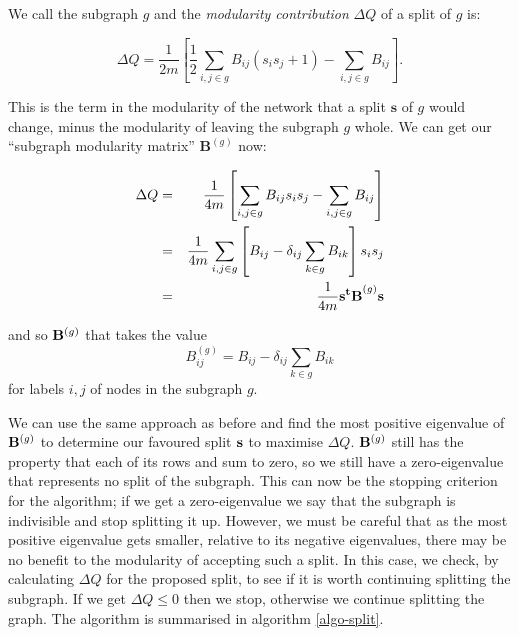 \documentclass[a4paper,12pt]{report}
\begin{document}
We call the subgraph $g$ and the {\sl modularity contribution} $\Delta Q$ of a 
split of $g$ is:

\begin{equation}
\Delta Q  =  \frac{1}{2m} \left[ \frac{1}{2}\sum_{i,j\in g}B_{ij}(s_is_j + 1) - \sum_{i,j \in g} B_{ij} \right].
\end{equation}

This is the term in the modularity of the network that a split $\mathbf{s}$ of 
$g$ would change, minus the modularity of leaving the subgraph $g$ whole.  We 
can get our ``subgraph modularity matrix'' $\mathbf{B}^{(g)}$ now:

\begin{samepage}
\begin{eqnarray}
\Delta Q & = & \frac{1}{4m}\left[ \sum_{i,j \in g} B_{ij}s_is_j - \sum_{i,j \in g}B_{ij}\right] \cr
& = & \frac{1}{4m}\sum_{i,j \in g}\left[ B_{ij} - \delta_{ij}\sum_{k \in g} B_{ik}\right]s_is_j \cr
& = & \frac{1}{4m}{\bf s^tB}^{(g)}{\bf s}
\end{eqnarray}
\end{samepage}
and so ${\bf B}^{(g)}$ that takes the value
\begin{equation}
B^{(g)}_{ij} = B_{ij} - \delta_{ij}\sum_{k \in g} B_{ik}
\end{equation}
for labels $i,j$ of nodes in the subgraph $g$.

We can use the same approach as before and find the most
positive eigenvalue of ${\bf B}^{(g)}$ to determine our favoured split
${\bf s}$ to maximise $\Delta Q$. ${\bf B}^{(g)}$ still has the
property that each of its rows and sum to zero, so we still have a
zero-eigenvalue that represents no split of the subgraph.  This can
now be the stopping criterion for the algorithm; if we get a
zero-eigenvalue we say that the subgraph is indivisible and stop
splitting it up.  However, we must be careful that as the most
positive eigenvalue gets smaller, relative to its negative
eigenvalues, there may be no benefit to the modularity of accepting
such a split.  In this case, we check, by calculating $\Delta Q$ for
the proposed split, to see if it is worth continuing splitting the subgraph.
If we get $\Delta Q \leq 0$ then we stop, otherwise we continue
splitting the graph.  The algorithm is summarised in algorithm \ref{algo-split}.
\end{document}
